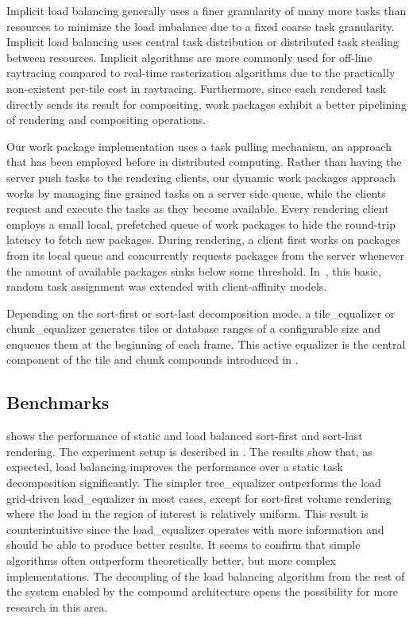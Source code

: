 Implicit load balancing generally uses a finer granularity of many more tasks
than resources to minimize the load imbalance due to a fixed coarse task
granularity. Implicit load balancing uses central task distribution or
distributed task stealing between resources. Implicit algorithms are more
commonly used for off-line raytracing compared to real-time rasterization
algorithms due to the practically non-existent per-tile cost in raytracing.
Furthermore, since each rendered task directly sends its result for
compositing, work packages exhibit a better pipelining of rendering and
compositing operations.

Our work package implementation uses a task pulling mechanism, an approach that
has been employed before in distributed computing. Rather than having the
server push tasks to the rendering clients, our dynamic work packages approach
works by managing fine grained tasks on a server side queue, while the clients
request and execute the tasks as they become available. Every rendering client
employs a small local, prefetched queue of work packages to hide the round-trip
latency to fetch new packages. During rendering, a client first works on
packages from its local queue and concurrently requests packages from the
server whenever the amount of available packages sinks below some threshold.
In~\cite{SPEP:16}, this basic, random task assignment was extended with
client-affinity models.

Depending on the sort-first or sort-last decomposition mode, a
\textsf{tile\_equalizer} or \textsf{chunk\_equalizer} generates tiles or
database ranges of a configurable size and enqueues them at the beginning of
each frame. This active equalizer is the central component of the tile and chunk
compounds introduced in .


\subsection{Benchmarks}

 shows the performance of static and load balanced sort-first
and sort-last rendering. The experiment setup is described in \cite{ESP:18}.
The results show that, as expected, load balancing improves the performance
over a static task decomposition significantly. The simpler
\textsf{tree\_equalizer} outperforms the load grid-driven
\textsf{load\_equalizer} in most cases, except for sort-first volume rendering
where the load in the region of interest is relatively uniform. This result is
counterintuitive since the \textsf{load\_equalizer} operates with more
information and should be able to produce better results. It seems to confirm
that simple algorithms often outperform theoretically better, but more complex
implementations. The decoupling of the load balancing algorithm from the rest
of the system enabled by the compound architecture opens the possibility for
more research in this area.

